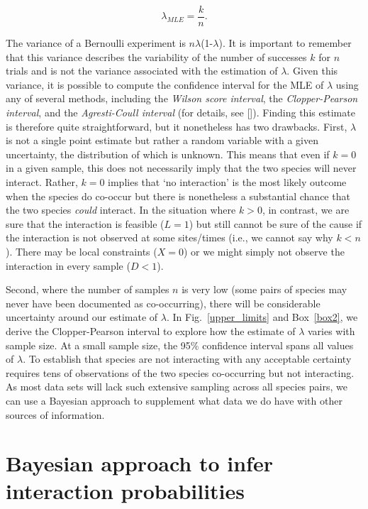 \documentclass[12pt]{article}
\begin{document}
\begin{spacing}{2.0}
      \begin{equation}
        \lambda_{MLE} = \frac{k}{n}  .
        \label{theta_MLE}
      \end{equation}

  The variance of a Bernoulli experiment is $n\lambda$(1-$\lambda$). It is important to remember that this variance describes the variability of the number of successes $k$ for $n$ trials and is not the variance associated with the estimation of $\lambda$. Given this variance, it is possible to compute the confidence interval for the MLE of $\lambda$ using any of several methods, including the \emph{Wilson score interval}, the \emph{Clopper-Pearson interval}, and the \emph{Agresti-Coull interval} (for details, see [\citealp{Brown2001}]). Finding this estimate is therefore quite straightforward, but it nonetheless has two drawbacks. First, $\lambda$ is not a single point estimate but rather a random variable with a given uncertainty, the distribution of which is unknown. This means that even if $k = 0$ in a given sample, this does not necessarily imply that the two species will never interact. Rather, $k = 0$ implies that `no interaction' is the most likely outcome when the species do co-occur but there is nonetheless a substantial chance that the two species \emph{could} interact. In the situation where $k>0$, in contrast, we are sure that the interaction is feasible ($L = 1$) but still cannot be sure of the cause if the interaction is not observed at some sites/times (i.e., we cannot say why $k<n$). There may be local constraints ($X=0$) or we might simply not observe the interaction in every sample ($D<1$). 


  Second, where the number of samples $n$ is very low (some pairs of species may never have been documented as co-occurring), there will be considerable uncertainty around our estimate of $\lambda$. In Fig.~\ref{upper_limits} and Box~\ref{box2}, we derive the Clopper-Pearson interval to explore how the estimate of $\lambda$ varies with sample size. At a small sample size, the 95\% confidence interval spans all values of $\lambda$. To establish that species are not interacting with any acceptable certainty requires tens of observations of the two species co-occurring but not interacting. As most data sets will lack such extensive sampling across all species pairs, we can use a Bayesian approach to supplement what data we do have with other sources of information.


\section*{Bayesian approach to infer interaction probabilities}


\end{spacing}
\end{document}
